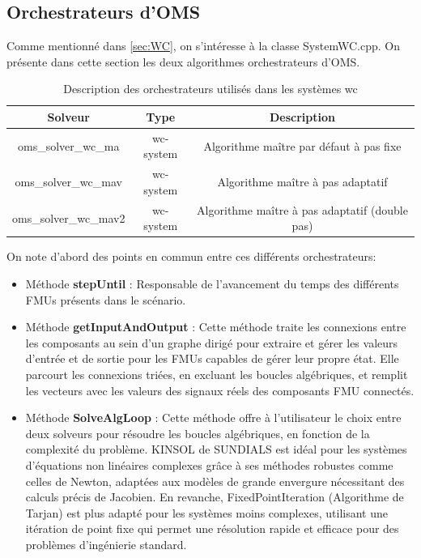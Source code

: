\subsection{Orchestrateurs d'OMS}

Comme mentionné dans \ref{sec:WC}, on s'intéresse à la classe SystemWC.cpp. On présente dans cette section les deux algorithmes orchestrateurs d'OMS.
\begin{table}[h]
    \centering
    \begin{adjustbox}{width=\textwidth}
    
    \begin{tabular}{|c|c|c|}
    \hline
    \textbf{Solveur} & \textbf{Type} & \textbf{Description} \\ \hline
    oms\_solver\_wc\_ma & wc-system & Algorithme maître par défaut à pas fixe \\ \hline
    oms\_solver\_wc\_mav & wc-system & Algorithme maître à pas adaptatif \\ \hline
    oms\_solver\_wc\_mav2 & wc-system & Algorithme maître à pas adaptatif (double pas) \\
    \hline
    \end{tabular}
\end{adjustbox}
    \caption{Description des orchestrateurs utilisés dans les systèmes wc}
    \end{table}

    On note d'abord des points en commun entre ces différents orchestrateurs: 
    \begin{itemize}
        \item Méthode \textbf{stepUntil} : Responsable de l'avancement du temps des différents FMUs présents dans le scénario. 
        \item Méthode \textbf{getInputAndOutput} : Cette méthode traite les connexions entre les composants au sein d'un graphe dirigé pour extraire et gérer les valeurs d'entrée et de sortie pour les FMUs capables de gérer leur propre état. Elle parcourt les connexions triées, en excluant les boucles algébriques, et remplit les vecteurs avec les valeurs des signaux réels des composants FMU connectés.
        \item Méthode \textbf{SolveAlgLoop} : Cette méthode offre à l'utilisateur le choix entre deux solveurs pour résoudre les boucles algébriques, en fonction de la complexité du problème. KINSOL de SUNDIALS est idéal pour les systèmes d'équations non linéaires complexes grâce à ses méthodes robustes comme celles de Newton, adaptées aux modèles de grande envergure nécessitant des calculs précis de Jacobien. En revanche, FixedPointIteration (Algorithme de Tarjan) est plus adapté pour les systèmes moins complexes, utilisant une itération de point fixe qui permet une résolution rapide et efficace pour des problèmes d'ingénierie standard.
    \end{itemize}


